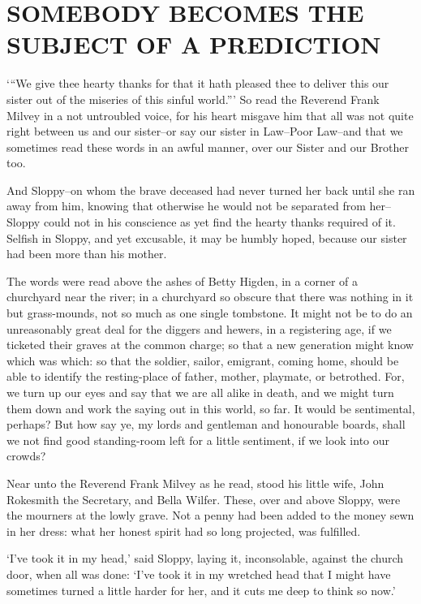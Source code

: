 
\chapter{SOMEBODY BECOMES THE SUBJECT OF A PREDICTION}

‘“We give thee hearty thanks for that it hath pleased thee to deliver
this our sister out of the miseries of this sinful world.”’ So read the
Reverend Frank Milvey in a not untroubled voice, for his heart misgave
him that all was not quite right between us and our sister--or say our
sister in Law--Poor Law--and that we sometimes read these words in an
awful manner, over our Sister and our Brother too.

And Sloppy--on whom the brave deceased had never turned her back until
she ran away from him, knowing that otherwise he would not be separated
from her--Sloppy could not in his conscience as yet find the hearty
thanks required of it. Selfish in Sloppy, and yet excusable, it may be
humbly hoped, because our sister had been more than his mother.

The words were read above the ashes of Betty Higden, in a corner of a
churchyard near the river; in a churchyard so obscure that there was
nothing in it but grass-mounds, not so much as one single tombstone.
It might not be to do an unreasonably great deal for the diggers and
hewers, in a registering age, if we ticketed their graves at the common
charge; so that a new generation might know which was which: so that the
soldier, sailor, emigrant, coming home, should be able to identify the
resting-place of father, mother, playmate, or betrothed. For, we turn up
our eyes and say that we are all alike in death, and we might turn
them down and work the saying out in this world, so far. It would
be sentimental, perhaps? But how say ye, my lords and gentleman and
honourable boards, shall we not find good standing-room left for a
little sentiment, if we look into our crowds?

Near unto the Reverend Frank Milvey as he read, stood his little wife,
John Rokesmith the Secretary, and Bella Wilfer. These, over and above
Sloppy, were the mourners at the lowly grave. Not a penny had been
added to the money sewn in her dress: what her honest spirit had so long
projected, was fulfilled.

‘I’ve took it in my head,’ said Sloppy, laying it, inconsolable, against
the church door, when all was done: ‘I’ve took it in my wretched head
that I might have sometimes turned a little harder for her, and it cuts
me deep to think so now.’

